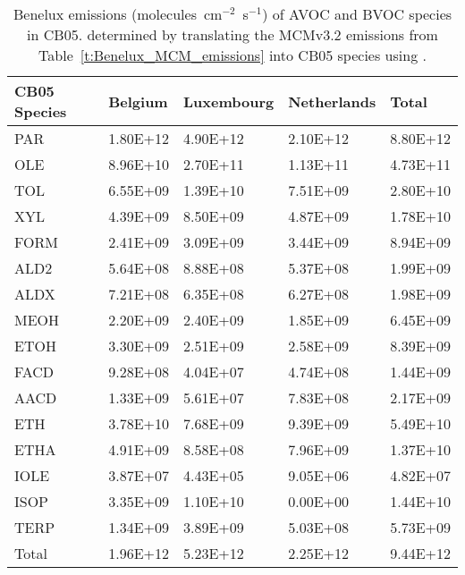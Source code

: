 \footnotesize
\begin{table}[ht!]
    \centering
    \caption{Benelux emissions (molecules~cm$^{-2}$~s$^{-1}$) of AVOC and BVOC species in CB05. determined by translating the MCMv3.2 emissions from Table~\ref{t:Benelux_MCM_emissions} into CB05 species using \citet{Yarwood:2005}.}%
\begin{tabular}{lllll}
	\hline \hline
	\textbf{CB05 Species} & \textbf{Belgium} & \textbf{Luxembourg} & \textbf{Netherlands} & \textbf{Total} \\ 
	\hline
	PAR & 1.80E+12 & 4.90E+12 & 2.10E+12 & 8.80E+12 \\
	OLE & 8.96E+10 & 2.70E+11 & 1.13E+11 & 4.73E+11 \\
	TOL & 6.55E+09 & 1.39E+10 & 7.51E+09 & 2.80E+10 \\
	XYL & 4.39E+09 & 8.50E+09 & 4.87E+09 & 1.78E+10 \\
	FORM & 2.41E+09 & 3.09E+09 & 3.44E+09 & 8.94E+09 \\
	ALD2 & 5.64E+08 & 8.88E+08 & 5.37E+08 & 1.99E+09 \\
	ALDX & 7.21E+08 & 6.35E+08 & 6.27E+08 & 1.98E+09 \\
	MEOH & 2.20E+09 & 2.40E+09 & 1.85E+09 & 6.45E+09 \\
	ETOH & 3.30E+09 & 2.51E+09 & 2.58E+09 & 8.39E+09 \\
	FACD & 9.28E+08 & 4.04E+07 & 4.74E+08 & 1.44E+09 \\
	AACD & 1.33E+09 & 5.61E+07 & 7.83E+08 & 2.17E+09 \\
	ETH & 3.78E+10 & 7.68E+09 & 9.39E+09 & 5.49E+10 \\
	ETHA & 4.91E+09 & 8.58E+08 & 7.96E+09 & 1.37E+10 \\
	IOLE & 3.87E+07 & 4.43E+05 & 9.05E+06 & 4.82E+07 \\
	ISOP & 3.35E+09 & 1.10E+10 & 0.00E+00 & 1.44E+10 \\
	TERP & 1.34E+09 & 3.89E+09 & 5.03E+08 & 5.73E+09 \\
	\hline Total & 1.96E+12 & 5.23E+12 & 2.25E+12 & 9.44E+12 \\
	\hline \hline
\end{tabular}
\label{t:CB05_NMVOC_emissions}
\end{table}

